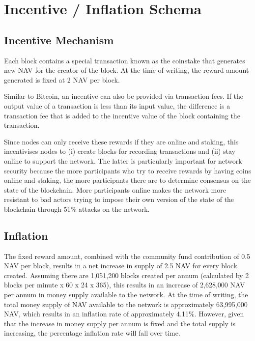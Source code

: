 \section{Incentive / Inflation Schema}
\label{S:7}
\subsection{Incentive Mechanism}

Each block contains a special transaction known as the coinstake that generates new NAV for the 
creator of the block. At the time of writing, the reward amount generated is fixed at 2 NAV per block. 

Similar to Bitcoin, an incentive can also be provided via transaction fees. If the output value 
of a transaction is less than its input value, the difference is a transaction fee that is added 
to the incentive value of the block containing the transaction. 

Since nodes can only receive these rewards if they are online and staking, this incentivises nodes to 
(i) create blocks for recording transactions and (ii) stay online to support the network. The latter 
is particularly important for network security because the more participants who try to receive 
rewards by having coins online and staking, the more participants there are to determine consensus on 
the state of the blockchain. More participants online makes the network more resistant to bad actors trying 
to impose their own version of the state of the blockchain through 51\% attacks on the network.

\subsection{Inflation}

The fixed reward amount, combined with the community fund contribution of 0.5 NAV per block, results in 
a net increase in supply of 2.5 NAV for every block created. Assuming there are 1,051,200 blocks created 
per annum (calculated by 2 blocks per minute x 60 x 24 x 365), this results in an increase of 2,628,000 
NAV per annum in money supply available to the network. At the time of writing, the total money supply of 
NAV available to the network is approximately 63,995,000 NAV, which results in an inflation rate of 
approximately 4.11\%. However, given that the increase in money supply per annum is fixed and the total 
supply is increasing, the percentage inflation rate will fall over time.


